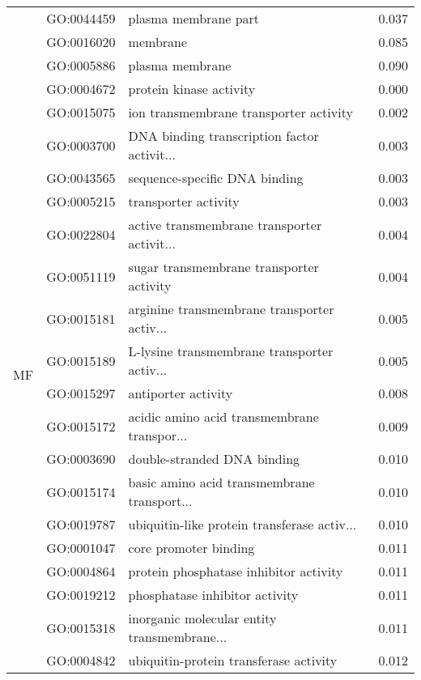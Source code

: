 \begin{longtable}{lllr}
   & GO:0044459 &                         plasma membrane part &         0.037 \\
   & GO:0016020 &                                     membrane &         0.085 \\
   & GO:0005886 &                              plasma membrane &         0.090 \\
\cline{1-4}
\multirow{40}{*}{MF} & GO:0004672 &                      protein kinase activity &         0.000 \\
   & GO:0015075 &       ion transmembrane transporter activity &         0.002 \\
   & GO:0003700 &  DNA binding transcription factor activit... &         0.003 \\
   & GO:0043565 &                sequence-specific DNA binding &         0.003 \\
   & GO:0005215 &                         transporter activity &         0.003 \\
   & GO:0022804 &  active transmembrane transporter activit... &         0.004 \\
   & GO:0051119 &     sugar transmembrane transporter activity &         0.004 \\
   & GO:0015181 &  arginine transmembrane transporter activ... &         0.005 \\
   & GO:0015189 &  L-lysine transmembrane transporter activ... &         0.005 \\
   & GO:0015297 &                          antiporter activity &         0.008 \\
   & GO:0015172 &  acidic amino acid transmembrane transpor... &         0.009 \\
   & GO:0003690 &                  double-stranded DNA binding &         0.010 \\
   & GO:0015174 &  basic amino acid transmembrane transport... &         0.010 \\
   & GO:0019787 &  ubiquitin-like protein transferase activ... &         0.010 \\
   & GO:0001047 &                        core promoter binding &         0.011 \\
   & GO:0004864 &       protein phosphatase inhibitor activity &         0.011 \\
   & GO:0019212 &               phosphatase inhibitor activity &         0.011 \\
   & GO:0015318 &  inorganic molecular entity transmembrane... &         0.011 \\
   & GO:0004842 &       ubiquitin-protein transferase activity &         0.012 \\

\end{longtable}

